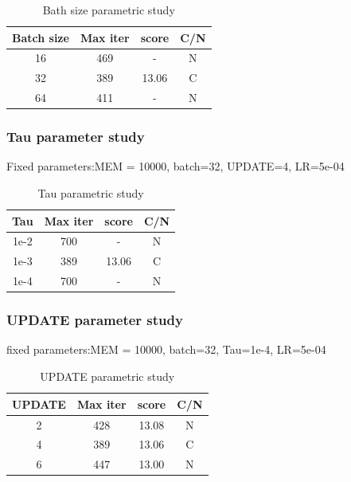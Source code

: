 \documentclass[12pt]{article}
\begin{document}
\begin{table}[H]
\centering
\begin{tabular}{|c|c|c|c|}
\hline
{\textbf{Batch size}} & {\textbf{Max iter}} & {\textbf{score}} & {\textbf{C/N}} \\ \hline
16 & 469 & -      & N \\ \hline
32  & 389 & 13.06 & C \\ \hline
64  & 411 & -     & N \\ \hline
\end{tabular}
\caption{Bath size parametric study}
\label{table:Batch}
\end{table}


\subsubsection{Tau parameter study}
Fixed parameters:MEM = 10000, batch=32, UPDATE=4, LR=5e-04

\begin{table}[H]
\centering
\begin{tabular}{|c|c|c|c|}
\hline
{\textbf{Tau}} & {\textbf{Max iter}} & {\textbf{score}} & {\textbf{C/N}} \\ \hline
1e-2 & 700 & -     & N \\ \hline
1e-3 & 389 & 13.06 & C \\ \hline
1e-4 & 700 & -     & N \\ \hline
\end{tabular}
\caption{Tau parametric study}
\label{table:Tau}
\end{table}


\subsubsection{UPDATE parameter study}
fixed parameters:MEM = 10000, batch=32, Tau=1e-4, LR=5e-04

\begin{table}[H]
\centering
\begin{tabular}{|c|c|c|c|}
\hline
{\textbf{UPDATE}} & {\textbf{Max iter}} & {\textbf{score}} & {\textbf{C/N}} \\ \hline
2  & 428 & 13.08 & N \\ \hline
4  & 389 & 13.06 & C \\ \hline
6  & 447 & 13.00 & N \\ \hline
\end{tabular}
\caption{UPDATE parametric study}
\label{table:UPDATE}
\end{table}
\end{document}
